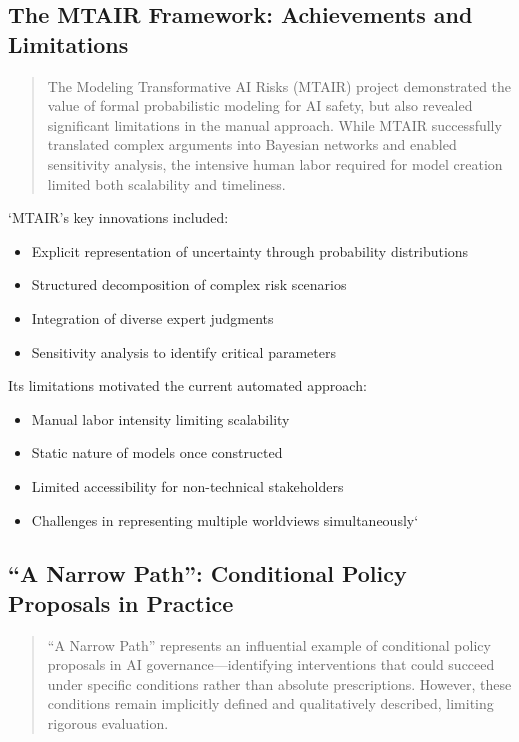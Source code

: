 \documentclass[]{book}
\providecommand{\tightlist}{%
  \setlength{\itemsep}{0pt}\setlength{\parskip}{0pt}}
\begin{document}
\subsection{The MTAIR Framework: Achievements and
Limitations}\label{sec-mtair-framework}

\begin{quote}
The Modeling Transformative AI Risks (MTAIR) project demonstrated the
value of formal probabilistic modeling for AI safety, but also revealed
significant limitations in the manual approach. While MTAIR successfully
translated complex arguments into Bayesian networks and enabled
sensitivity analysis, the intensive human labor required for model
creation limited both scalability and timeliness.
\end{quote}

`MTAIR's key innovations included:

\begin{itemize}
\tightlist
\item
  Explicit representation of uncertainty through probability
  distributions
\item
  Structured decomposition of complex risk scenarios
\item
  Integration of diverse expert judgments
\item
  Sensitivity analysis to identify critical parameters
\end{itemize}

Its limitations motivated the current automated approach:

\begin{itemize}
\tightlist
\item
  Manual labor intensity limiting scalability
\item
  Static nature of models once constructed
\item
  Limited accessibility for non-technical stakeholders
\item
  Challenges in representing multiple worldviews simultaneously`
\end{itemize}

\subsection{``A Narrow Path'': Conditional Policy Proposals in
Practice}\label{sec-narrow-path}

\begin{quote}
``A Narrow Path'' represents an influential example of conditional
policy proposals in AI governance---identifying interventions that could
succeed under specific conditions rather than absolute prescriptions.
However, these conditions remain implicitly defined and qualitatively
described, limiting rigorous evaluation.
\end{quote}
\end{document}
